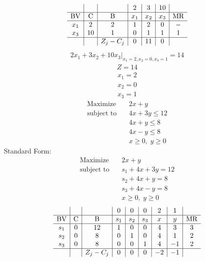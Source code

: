 \documentclass{article}
\begin{document}
\begin{align*}
\begin{array}{c|c|c|c|c|c|c}
 &  &  & 2 & 3 & 10 & \\
\hline
\text{BV} & \text{C} & \text{B} & x_{1} & x_{2} & x_{3} & \text{MR} \\
\hline
x_{1} & 2 & 2 & 1 & 2 & 0 & - \\
x_{3} & 10 & 1 & 0 & 1 & 1 & 1 \\
\hline
 &  & Z_j-C_j & 0 & 11 & 0 & \\
\end{array}
\end{align*}
\begin{align*}
\left.2x_{1} + 3x_{2} + 10x_{3}\right|_{x_{1}=2,x_{2}=0,x_{3}=1}=14\end{align*}
\begin{align*}
Z=14\end{align*}
\begin{align*}
x_{1}=2\end{align*}
\begin{align*}
x_{2}=0\end{align*}
\begin{align*}
x_{3}=1\end{align*}
\begin{align*}
\text{Maximize} \quad & 2x + y\\
\text{subject to} \quad
& 4x + 3y\le12\\
& 4x + y\le8\\
& 4x - y\le8\\
& x\ge0,\; y\ge0\end{align*}
Standard Form:\\
\begin{align*}
\text{Maximize} \quad & 2x + y\\
\text{subject to} \quad
& s_{1} + 4x + 3y=12\\
& s_{2} + 4x + y=8\\
& s_{3} + 4x - y=8\\
& x\ge0,\; y\ge0\end{align*}
\begin{align*}
\begin{array}{c|c|c|c|c|c|c|c|c}
 &  &  & 0 & 0 & 0 & 2 & 1 & \\
\hline
\text{BV} & \text{C} & \text{B} & s_{1} & s_{2} & s_{3} & x & y & \text{MR} \\
\hline
s_{1} & 0 & 12 & 1 & 0 & 0 & 4 & 3 & 3 \\
s_{2} & 0 & 8 & 0 & 1 & 0 & 4 & 1 & 2 \\
s_{3} & 0 & 8 & 0 & 0 & 1 & 4 & -1 & 2 \\
\hline
 &  & Z_j-C_j & 0 & 0 & 0 & -2 & -1 & \\
\end{array}
\end{align*}
\end{document}
